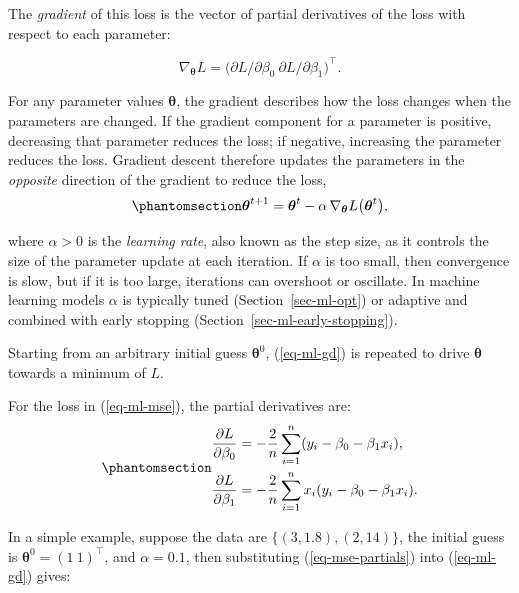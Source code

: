 \documentclass[
  letterpaper,
  krantz2]{style/krantz}
\begin{document}
The \emph{gradient} of this loss is the vector of partial derivatives of
the loss with respect to each parameter:

\[
\nabla_{\boldsymbol{\theta}} L = \bigl(\partial L / \partial \beta_0 \ \partial L / \partial \beta_1\bigr)^\top.
\]

For any parameter values \(\boldsymbol{\theta}\), the gradient describes
how the loss changes when the parameters are changed. If the gradient
component for a parameter is positive, decreasing that parameter reduces
the loss; if negative, increasing the parameter reduces the loss.
Gradient descent therefore updates the parameters in the \emph{opposite}
direction of the gradient to reduce the loss,
\begin{equation}\phantomsection\label{eq-ml-gd}{
\boldsymbol{\theta}^{t+1} = \boldsymbol{\theta}^{t} - \alpha \,\nabla_{\boldsymbol{\theta}} L\bigl(\boldsymbol{\theta}^{t}\bigr),
}\end{equation}

where \(\alpha > 0\) is the \emph{learning rate},
also known as the step size, as it controls the size of the parameter
update at each iteration. If \(\alpha\) is too small, then convergence
is slow, but if it is too large, iterations can overshoot or oscillate.
In machine learning models \(\alpha\) is typically
tuned (Section~\ref{sec-ml-opt}) or
adaptive and combined with early stopping
(Section~\ref{sec-ml-early-stopping}).

Starting from an arbitrary initial guess \(\boldsymbol{\theta}^{0}\),
(\ref{eq-ml-gd}) is repeated to drive \(\boldsymbol{\theta}\) towards a
minimum of \(L\).

For the loss in (\ref{eq-ml-mse}), the partial derivatives are:
\begin{equation}\phantomsection\label{eq-mse-partials}{
\begin{aligned}
\frac{\partial L}{\partial \beta_0} &= -\frac{2}{n}\sum_{i=1}^n (y_i - \beta_0 - \beta_1 x_i), \\
\frac{\partial L}{\partial \beta_1} &= -\frac{2}{n}\sum_{i=1}^n x_i (y_i - \beta_0 - \beta_1 x_i).
\end{aligned}
}\end{equation}

In a simple example, suppose the data are \(\{(3, 1.8), (2, 14)\}\), the
initial guess is \(\boldsymbol{\theta}^{0} = (1 \ 1)^\top\), and
\(\alpha=0.1\), then substituting (\ref{eq-mse-partials}) into
(\ref{eq-ml-gd}) gives:
\end{document}
